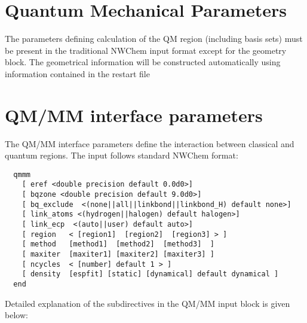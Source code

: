 \section{Quantum Mechanical Parameters}
 
The parameters defining calculation of the QM region (including basis sets) 
must be present in the traditional NWChem input format
except for the geometry block. The geometrical information will
be constructed automatically using information contained in the restart file

\section{QM/MM interface parameters}

The QM/MM interface parameters define the interaction between classical and quantum regions.
The  input follows standard NWChem format:
\begin{verbatim}
  qmmm
    [ eref <double precision default 0.0d0>]
    [ bqzone <double precision default 9.0d0>]
    [ bq_exclude  <(none||all||linkbond||linkbond_H) default none>]
    [ link_atoms <(hydrogen||halogen) default halogen>]
    [ link_ecp  <(auto||user) default auto>]
    [ region   < [region1]  [region2]  [region3] > ]
    [ method   [method1]  [method2]  [method3]  ]
    [ maxiter  [maxiter1] [maxiter2] [maxiter3] ]
    [ ncycles  < [number] default 1 > ]
    [ density  [espfit] [static] [dynamical] default dynamical ]
  end
\end{verbatim}

Detailed explanation of the subdirectives in the QM/MM input block is given below:

